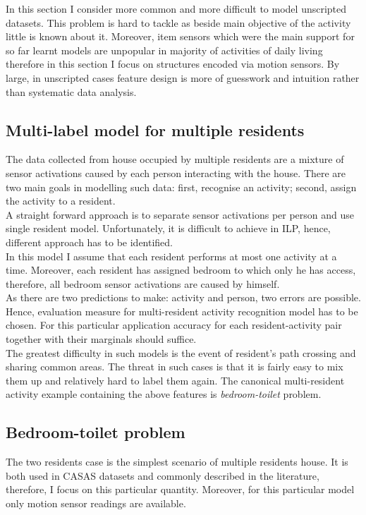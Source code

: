 \documentclass[10pt, a4paper, pdflatex, leqno, twoside, openright]{report}
\begin{document}
In this section I consider more common and more difficult to model unscripted datasets. This problem is hard to tackle as beside main objective of the activity little is known about it. Moreover, item sensors which were the main support for so far learnt models are unpopular in majority of activities of daily living therefore in this section I focus on structures encoded via motion sensors. By large, in unscripted cases feature design is more of guesswork and intuition rather than systematic data analysis.

    \subsection{Multi-label model for multiple residents\label{ch:mlm}}
The data collected from house occupied by multiple residents are a mixture of sensor activations caused by each person interacting with the house. There are two main goals in modelling such data: first, recognise an activity; second, assign the activity to a resident.\\
A straight forward approach is to separate sensor activations per person and use single resident model. Unfortunately, it is difficult to achieve in ILP, hence, different approach has to be identified.\\

In this model I assume that each resident performs at most one activity at a time. Moreover, each resident has assigned bedroom to which only he has access, therefore, all bedroom sensor activations are caused by himself.\\
As there are two predictions to make: activity and person, two errors are possible. Hence, evaluation measure for multi-resident activity recognition model has to be chosen. For this particular application accuracy for each resident-activity pair together with their marginals should suffice.\\

The greatest difficulty in such models is the event of resident's path crossing and sharing common areas. The threat in such cases is that it is fairly easy to mix them up and relatively hard to label them again. The canonical multi-resident activity example containing the above features is \emph{bedroom-toilet} problem.

    \subsection{Bedroom-toilet problem}
The two residents case is the simplest scenario of multiple residents house. It is both used in CASAS datasets and commonly described in the literature, therefore, I focus on this particular quantity. Moreover, for this particular model only motion sensor readings are available.\\
\end{document}
